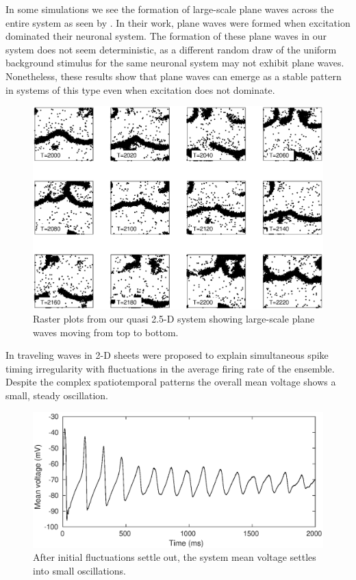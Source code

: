 In some simulations we see the formation of large-scale plane waves across the entire system as seen by \citet{keane2015}.
In their work, plane waves were formed when excitation dominated their neuronal system.
The formation of these plane waves in our system does not seem deterministic, as a different random draw of the uniform background stimulus for the same neuronal system may not exhibit plane waves.
Nonetheless, these results show that plane waves can emerge as a stable pattern in systems of this type even when excitation does not dominate.
\begin{figure}[!htb]
 \caption{ Raster plots from our quasi 2.5-D system showing large-scale plane waves moving from top to bottom.}
 \label{fig:2D_plane_wave}
 \centering
   \includegraphics[width=\textwidth]{fig/2DWaveRasters_PlaneWave}
\end{figure}

\FloatBarrier

In \citet{keane2015} traveling waves in 2-D sheets were proposed to explain simultaneous spike timing irregularity with fluctuations in the average firing rate of the ensemble. 
Despite the complex spatiotemporal patterns the overall mean voltage shows a small, steady oscillation.
\begin{figure}[!htb]
 \caption{ After initial fluctuations settle out, the system mean voltage settles into small oscillations.}
 \label{fig:2D_mean_voltage}
 \centering
   \includegraphics[width=\textwidth]{fig/MeanVoltage_PBC}
\end{figure}


